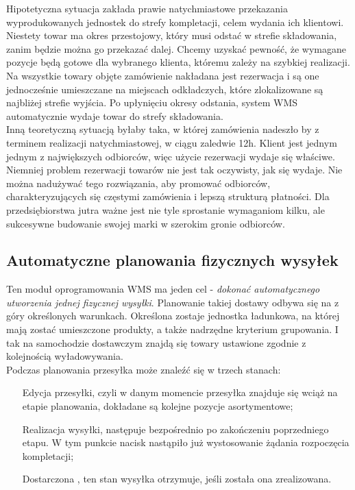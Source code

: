 		Hipotetyczna sytuacja zakłada prawie natychmiastowe przekazania wyprodukowanych jednostek do strefy kompletacji,
		celem wydania ich klientowi. Niestety towar ma okres przestojowy, który musi odstać w strefie składowania, 
		zanim będzie można go przekazać dalej. Chcemy uzyskać pewność, że wymagane pozycje będą gotowe
		dla wybranego klienta, któremu zależy na szybkiej realizacji. Na wszystkie towary objęte zamówienie nakładana
		jest rezerwacja i są one jednocześnie umieszczane na miejscach odkładczych, które zlokalizowane są najbliżej
		strefie wyjścia. Po upłynięciu okresy odstania, system WMS automatycznie wydaje towar do strefy składowania.\\
		Inną teoretyczną sytuacją byłaby taka, w której zamówienia nadeszło by z terminem realizacji natychmiastowej, w ciągu
		zaledwie 12h. Klient jest jednym jednym z największych odbiorców, więc użycie rezerwacji wydaje się właściwe. \\
		
		Niemniej problem rezerwacji towarów nie jest tak oczywisty, jak się wydaje. Nie można nadużywać tego rozwiązania,
		aby promować odbiorców, charakteryzujących się częstymi zamówienia i lepszą strukturą płatności. Dla przedsiębiorstwa
		jutra ważne jest nie tyle sprostanie wymaganiom kilku, ale sukcesywne budowanie swojej marki w szerokim gronie
		odbiorców. 
	\subsection{Automatyczne planowania fizycznych wysyłek}
		Ten moduł oprogramowania WMS ma jeden cel - \emph{dokonać automatycznego utworzenia jednej fizycznej wysyłki}.
		Planowanie takiej dostawy odbywa się na z góry określonych warunkach. Określona zostaje jednostka ładunkowa, na
		której mają zostać umieszczone produkty, a także nadrzędne kryterium grupowania. I tak na samochodzie dostawczym
		znajdą się towary ustawione zgodnie z kolejnością wyładowywania. \\
		
		Podczas planowania przesyłka może znaleźć się w trzech stanach:
		\begin{enumerate}
			\item[Edycja] przesyłki, czyli w danym momencie przesyłka znajduje się wciąż na etapie planowania, dokładane
			są kolejne pozycje asortymentowe;
			\item[Realizacja] wysyłki, następuje bezpośrednio po zakończeniu poprzedniego etapu. W tym punkcie nacisk
			nastąpiło już wystosowanie żądania rozpoczęcia kompletacji;
			\item[Dostarczona], ten stan wysyłka otrzymuje, jeśli została ona zrealizowana.
		\end{enumerate}

